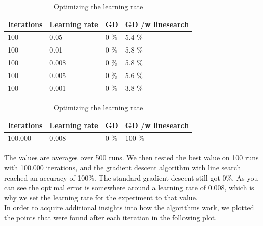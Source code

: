 \documentclass{article}
\begin{document}
\begin{table}[H]
    \parbox{.45\linewidth}{
	\centering
		\begin{tabular}{|l|l|l|l|}
        \hline
		Iterations & Learning rate & GD & GD /w linesearch \\ \hline 
		100 & 0.05 & 0 \% & 5.4 \% \\ \hline
		100 & 0.01 & 0 \% & 5.8 \% \\ \hline
		100 & 0.008 & 0 \% & 5.8 \% \\ \hline
		100 & 0.005 & 0 \% & 5.6 \% \\ \hline
		100 & 0.001 & 0 \% & 3.8 \% \\ \hline
		\end{tabular}
    }
    \hfill
    \parbox{.45\linewidth}{
	\centering
		\begin{tabular}{|l|l|l|l|}
        \hline
		Iterations & Learning rate & GD & GD /w linesearch \\ \hline 
		100.000 & 0.008 & 0 \% & 100 \% \\ \hline
		\end{tabular}
    }
    \caption{Optimizing the learning rate}
    \label{tab:learningrate}
\end{table}
    
The values are averages over 500 runs. We then tested the best value on 100 runs with 100.000 iterations, and the gradient descent algorithm with line search reached an accuracy of 100\%. The standard gradient descent still got 0\%.
As you can see the optimal error is somewhere around a learning rate of 0.008, which is why we set the learning rate for the experiment to that value. \\

In order to acquire additional insights into how the algorithms work, we plotted the points that were found after each iteration in the following plot.
\end{document}
